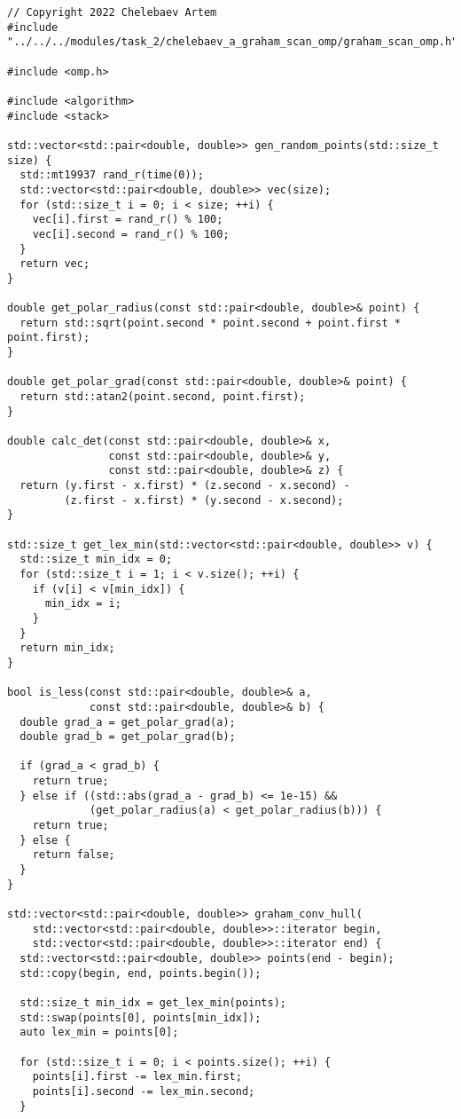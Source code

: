 \documentclass{report}
\begin{document}
\begin{lstlisting}
// Copyright 2022 Chelebaev Artem
#include "../../../modules/task_2/chelebaev_a_graham_scan_omp/graham_scan_omp.h"

#include <omp.h>

#include <algorithm>
#include <stack>

std::vector<std::pair<double, double>> gen_random_points(std::size_t size) {
  std::mt19937 rand_r(time(0));
  std::vector<std::pair<double, double>> vec(size);
  for (std::size_t i = 0; i < size; ++i) {
    vec[i].first = rand_r() % 100;
    vec[i].second = rand_r() % 100;
  }
  return vec;
}

double get_polar_radius(const std::pair<double, double>& point) {
  return std::sqrt(point.second * point.second + point.first * point.first);
}

double get_polar_grad(const std::pair<double, double>& point) {
  return std::atan2(point.second, point.first);
}

double calc_det(const std::pair<double, double>& x,
                const std::pair<double, double>& y,
                const std::pair<double, double>& z) {
  return (y.first - x.first) * (z.second - x.second) -
         (z.first - x.first) * (y.second - x.second);
}

std::size_t get_lex_min(std::vector<std::pair<double, double>> v) {
  std::size_t min_idx = 0;
  for (std::size_t i = 1; i < v.size(); ++i) {
    if (v[i] < v[min_idx]) {
      min_idx = i;
    }
  }
  return min_idx;
}

bool is_less(const std::pair<double, double>& a,
             const std::pair<double, double>& b) {
  double grad_a = get_polar_grad(a);
  double grad_b = get_polar_grad(b);

  if (grad_a < grad_b) {
    return true;
  } else if ((std::abs(grad_a - grad_b) <= 1e-15) &&
             (get_polar_radius(a) < get_polar_radius(b))) {
    return true;
  } else {
    return false;
  }
}

std::vector<std::pair<double, double>> graham_conv_hull(
    std::vector<std::pair<double, double>>::iterator begin,
    std::vector<std::pair<double, double>>::iterator end) {
  std::vector<std::pair<double, double>> points(end - begin);
  std::copy(begin, end, points.begin());

  std::size_t min_idx = get_lex_min(points);
  std::swap(points[0], points[min_idx]);
  auto lex_min = points[0];

  for (std::size_t i = 0; i < points.size(); ++i) {
    points[i].first -= lex_min.first;
    points[i].second -= lex_min.second;
  }


\end{lstlisting}
\end{document}
